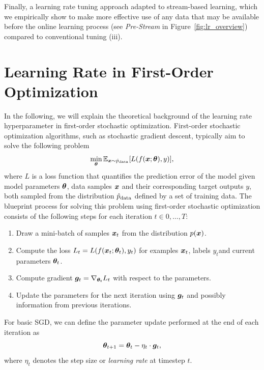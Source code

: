 \documentclass{article} %
\begin{document}
Finally, a learning rate tuning approach adapted to stream-based learning, which we empirically show to make more effective use of any data that may be available before the online learning process (see \textit{Pre-Stream} in Figure~\ref{fig:lr_overview}) compared to conventional tuning (iii).

\section{Learning Rate in First-Order Optimization}

In the following, we will explain the theoretical background of the learning rate hyperparameter in first-order stochastic optimization.
First-order stochastic optimization algorithms, such as stochastic gradient descent, typically aim to solve the following problem
\begin{equation}
   \min_{{\bm{\theta}}} \mathbb{E}_{{\bm{x}} \sim \hat{p}_{\rm{data}}} [L(f({\bm{x}}; {\bm{\theta}}), y)],
\end{equation}
where $L$ is a loss function that quantifies the prediction error of the model given model parameters ${\bm{\theta}}$, data samples ${\bm{x}}$ and their corresponding target outputs $y$, both sampled from the distribution $\hat{p}_{\rm{data}}$ defined by a set of training data.
The blueprint process for solving this problem using first-order stochastic optimization consists of the following steps for each iteration $t \in 0, \ldots, T$:
\begin{enumerate}
   \item Draw a mini-batch of samples ${\bm{x}}_t$ from the distribution $p({\bm{x}})$.
   \item Compute the loss $L_t = L(f({\bm{x}}_t; {\bm{\theta}}_t), y_t)$ for examples ${\bm{x}}_t$, labels $y_t$\footnotemark[1] and current parameters ${\bm{\theta}}_t$.
   \item Compute gradient ${\bm{g}}_t = \nabla_{{\bm{\theta}}_t} L_t$ with respect to the parameters.
   \item Update the parameters for the next iteration using ${\bm{g}}_t$ and possibly information from previous iterations.
\end{enumerate}


For basic SGD, we can define the parameter update performed at the end of each iteration as
\begin{equation}\label{eq:sgd_update}
   {\bm{\theta}}_{t+1}  = {\bm{\theta}}_{t} - \eta_t \cdot {\bm{g}}_t,
\end{equation}
where $\eta_t$ denotes the step size or \textit{learning rate} at timestep $t$.
\end{document}
